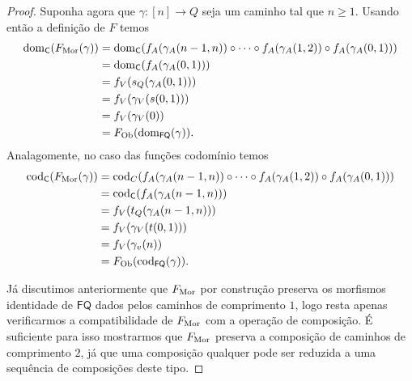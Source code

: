 \begin{proof}
    Suponha agora que $\gamma: [n] \to Q$ seja um caminho tal que $n \geq 1$.
    Usando então a definição de $F$ temos
    \begin{align*}
        \mathrm{dom}_{\mathsf{C}}(F_{\mathrm{Mor}}(\gamma))
        & = \mathrm{dom}_{\mathsf{C}}(f_A(\gamma_A(n-1,n)) \circ \dotsm \circ f_A(\gamma_A(1,2)) \circ f_A(\gamma_A(0,1))) \\
        & = \mathrm{dom}_{\mathsf{C}}(f_A(\gamma_A(0,1))) \\
        & = f_V(s_Q(\gamma_A(0,1))) \\
        & = f_V(\gamma_V(s(0,1))) \\
        & = f_V(\gamma_V(0)) \\
        & = F_{\mathrm{Ob}}(\mathrm{dom}_{\mathsf{FQ}}(\gamma)).
    \end{align*}
    Analagomente, no caso das funções codomínio temos
    \begin{align*}
        \mathrm{cod}_{\mathsf{C}}(F_{\mathrm{Mor}}(\gamma))
        & = \mathrm{cod}_{C}(f_A(\gamma_A(n-1,n)) \circ \dotsm \circ f_A(\gamma_A(1,2)) \circ f_A(\gamma_A(0,1))) \\
        & = \mathrm{cod}_{\mathsf{C}}(f_A(\gamma_A(n-1,n))) \\
        & = f_V(t_Q(\gamma_A(n-1,n))) \\
        & = f_V(\gamma_V(t(0,1))) \\
        & = f_V(\gamma_v(n)) \\
        & = F_{\mathrm{Ob}}(\mathrm{cod}_{\mathsf{FQ}}(\gamma)).
    \end{align*}

    Já discutimos anteriormente que $F_{\mathrm{Mor}}$ por construção preserva os morfismos identidade de $\mathsf{FQ}$ dados pelos caminhos de comprimento $1$, logo resta apenas verificarmos a compatibilidade de $F_{\mathrm{Mor}}$ com a operação de composição.
    É suficiente para isso mostrarmos que $F_{\mathrm{Mor}}$ preserva a composição de caminhos de comprimento $2$, já que uma composição qualquer pode ser reduzida a uma sequência de composições deste tipo.
\end{proof}
